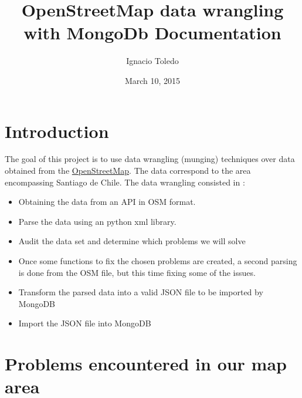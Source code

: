 \documentclass[a4paper,10pt,english]{sphinxhowto}
\title{OpenStreetMap data wrangling with MongoDb Documentation}
\date{March 10, 2015}
\author{Ignacio Toledo}
\begin{document}
\maketitle
\tableofcontents
{}\label{index::doc}



\section{Introduction}
\label{index:introduction}\label{index:openstreetmap-data-wrangling-with-mongodb}
The goal of this project is to use data wrangling (munging) techniques over data
obtained from the \href{http://www.openstreetmap.org}{OpenStreetMap}. The data
correspond to the area encompassing Santiago de Chile. The data wrangling
consisted in :
\begin{itemize}
\item {} 
Obtaining the data from an API in OSM format.

\item {} 
Parse the data using an python xml library.

\item {} 
Audit the data set and determine which problems we will solve

\item {} 
Once some functions to fix the chosen problems are created, a second parsing
is done from the OSM file, but this time fixing some of the issues.

\item {} 
Transform the parsed data into a valid JSON file to be imported by MongoDB

\item {} 
Import the JSON file into MongoDB

\end{itemize}


\section{Problems encountered in our map area}
\label{index:problems-encountered-in-our-map-area}
\end{document}
